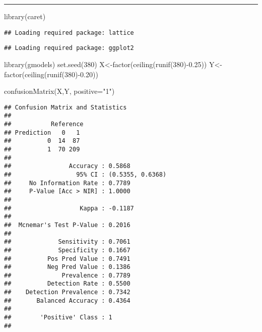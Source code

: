 \documentclass[
]{article}
\newenvironment{Shaded}{\begin{snugshade}}{\end{snugshade}}
\newcommand{\AttributeTok}[1]{\textcolor[rgb]{0.77,0.63,0.00}{#1}}
\newcommand{\DecValTok}[1]{\textcolor[rgb]{0.00,0.00,0.81}{#1}}
\newcommand{\FloatTok}[1]{\textcolor[rgb]{0.00,0.00,0.81}{#1}}
\newcommand{\FunctionTok}[1]{\textcolor[rgb]{0.00,0.00,0.00}{#1}}
\newcommand{\NormalTok}[1]{#1}
\newcommand{\OtherTok}[1]{\textcolor[rgb]{0.56,0.35,0.01}{#1}}
\newcommand{\SpecialCharTok}[1]{\textcolor[rgb]{0.00,0.00,0.00}{#1}}
\newcommand{\StringTok}[1]{\textcolor[rgb]{0.31,0.60,0.02}{#1}}
\begin{document}
\begin{center}\rule{0.5\linewidth}{0.5pt}\end{center}

\begin{Shaded}
\begin{Highlighting}[]
\FunctionTok{library}\NormalTok{(caret)}
\end{Highlighting}
\end{Shaded}

\begin{verbatim}
## Loading required package: lattice
\end{verbatim}

\begin{verbatim}
## Loading required package: ggplot2
\end{verbatim}

\begin{Shaded}
\begin{Highlighting}[]
\FunctionTok{library}\NormalTok{(gmodels)}
\FunctionTok{set.seed}\NormalTok{(}\DecValTok{380}\NormalTok{)}
\NormalTok{X}\OtherTok{\textless{}{-}}\FunctionTok{factor}\NormalTok{(}\FunctionTok{ceiling}\NormalTok{(}\FunctionTok{runif}\NormalTok{(}\DecValTok{380}\NormalTok{)}\SpecialCharTok{{-}}\FloatTok{0.25}\NormalTok{))}
\NormalTok{Y}\OtherTok{\textless{}{-}}\FunctionTok{factor}\NormalTok{(}\FunctionTok{ceiling}\NormalTok{(}\FunctionTok{runif}\NormalTok{(}\DecValTok{380}\NormalTok{)}\SpecialCharTok{{-}}\FloatTok{0.20}\NormalTok{))}

\FunctionTok{confusionMatrix}\NormalTok{(X,Y, }\AttributeTok{positive=}\StringTok{"1"}\NormalTok{)}
\end{Highlighting}
\end{Shaded}

\begin{verbatim}
## Confusion Matrix and Statistics
## 
##           Reference
## Prediction   0   1
##          0  14  87
##          1  70 209
##                                           
##                Accuracy : 0.5868          
##                  95% CI : (0.5355, 0.6368)
##     No Information Rate : 0.7789          
##     P-Value [Acc > NIR] : 1.0000          
##                                           
##                   Kappa : -0.1187         
##                                           
##  Mcnemar's Test P-Value : 0.2016          
##                                           
##             Sensitivity : 0.7061          
##             Specificity : 0.1667          
##          Pos Pred Value : 0.7491          
##          Neg Pred Value : 0.1386          
##              Prevalence : 0.7789          
##          Detection Rate : 0.5500          
##    Detection Prevalence : 0.7342          
##       Balanced Accuracy : 0.4364          
##                                           
##        'Positive' Class : 1               
## 
\end{verbatim}
\end{document}
